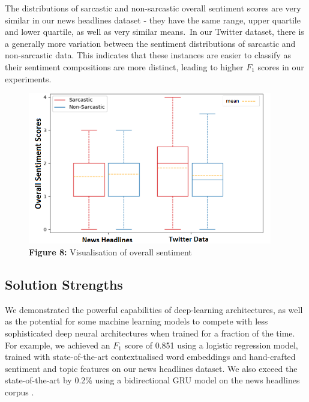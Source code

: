 \documentclass[12pt,a4paper]{article}
\begin{document}
\vspace{-13pt}\hspace{-18pt}\begin{minipage}{0.5\textwidth}
	The distributions of sarcastic and non-sarcastic overall sentiment scores are very similar in our news headlines dataset - they have the same range, upper quartile and lower quartile, as well as very similar means.\ In our Twitter dataset, there is a generally more variation between the sentiment distributions of sarcastic and non-sarcastic data. This indicates that these instances are easier to classify as their sentiment compositions are more distinct, leading to higher $F_1$ scores in our experiments.
\end{minipage}\hspace{10pt}
\begin{minipage}{0.48\textwidth}
	\vspace{-10pt}\begin{figure}[H]
		\begin{center}
			\includegraphics[width=0.95\textwidth]{Images/boxcompare.png}\\
			\textbf{Figure 8:} Visualisation of overall sentiment\\
		\end{center}
	\end{figure}
\end{minipage}


\subsection{Solution Strengths}\vspace{-10pt}
\noindent We demonstrated the powerful capabilities of deep-learning architectures, as well as the potential for some machine learning models to compete with less sophisticated deep neural architectures when trained for a fraction of the time. For example, we achieved an $F_1$ score of 0.851 using a logistic regression model, trained with state-of-the-art contextualised word embeddings and hand-crafted sentiment and topic features on our news headlines dataset. We also exceed the state-of-the-art by 0.2\% using a bidirectional GRU model on the news headlines corpus \cite{misra2019sarcasm}.
\end{document}
